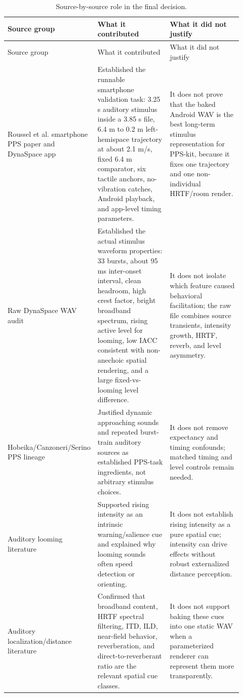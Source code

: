 \documentclass[10pt]{article}
\begin{document}
\begin{longtable}{P{0.22\linewidth} P{0.34\linewidth} P{0.36\linewidth}}
\caption{Source-by-source role in the final decision.}\\
\toprule
Source group & What it contributed & What it did not justify\\
\midrule
\endfirsthead
\toprule
Source group & What it contributed & What it did not justify\\
\midrule
\endhead
Roussel et al. smartphone PPS paper and DynaSpace app & Established the runnable smartphone validation task: 3.25 s auditory stimulus inside a 3.85 s file, 6.4 m to 0.2 m left-hemispace trajectory at about 2.1 m/s, fixed 6.4 m comparator, six tactile anchors, no-vibration catches, Android playback, and app-level timing parameters. & It does not prove that the baked Android WAV is the best long-term stimulus representation for PPS-kit, because it fixes one trajectory and one non-individual HRTF/room render.\\
Raw DynaSpace WAV audit & Established the actual stimulus waveform properties: 33 bursts, about 95 ms inter-onset interval, clean headroom, high crest factor, bright broadband spectrum, rising active level for looming, low IACC consistent with non-anechoic spatial rendering, and a large fixed-vs-looming level difference. & It does not isolate which feature caused behavioral facilitation; the raw file combines source transients, intensity growth, HRTF, reverb, and level asymmetry.\\
Hobeika/Canzoneri/Serino PPS lineage & Justified dynamic approaching sounds and repeated burst-train auditory sources as established PPS-task ingredients, not arbitrary stimulus choices. & It does not remove expectancy and timing confounds; matched timing and level controls remain needed.\\
Auditory looming literature & Supported rising intensity as an intrinsic warning/salience cue and explained why looming sounds often speed detection or orienting. & It does not establish rising intensity as a pure spatial cue; intensity can drive effects without robust externalized distance perception.\\
Auditory localization/distance literature & Confirmed that broadband content, HRTF spectral filtering, ITD, ILD, near-field behavior, reverberation, and direct-to-reverberant ratio are the relevant spatial cue classes. & It does not support baking these cues into one static WAV when a parameterized renderer can represent them more transparently.\\

\end{longtable}
\end{document}

